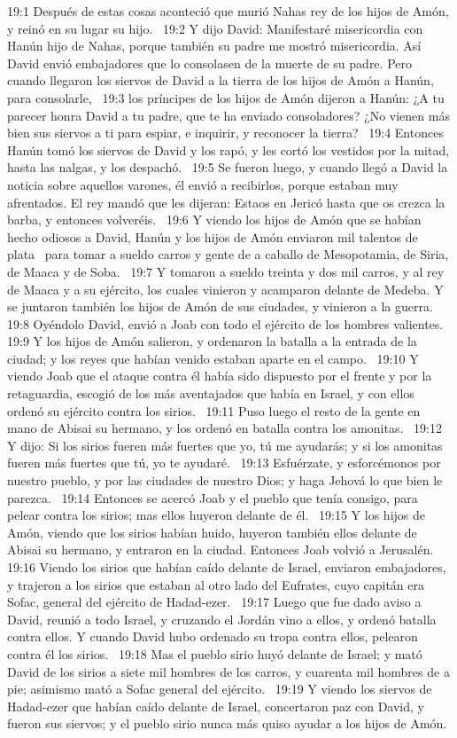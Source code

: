 19:1 Después de estas cosas aconteció que murió Nahas rey de los hijos de Amón, y reinó en su lugar su hijo.  
19:2 Y dijo David: Manifestaré misericordia con Hanún hijo de Nahas, porque también su padre me mostró misericordia. Así David envió embajadores que lo consolasen de la muerte de su padre. Pero cuando llegaron los siervos de David a la tierra de los hijos de Amón a Hanún, para consolarle,  
19:3 los príncipes de los hijos de Amón dijeron a Hanún: ¿A tu parecer honra David a tu padre, que te ha enviado consoladores? ¿No vienen más bien sus siervos a ti para espiar, e inquirir, y reconocer la tierra?  
19:4 Entonces Hanún tomó los siervos de David y los rapó, y les cortó los vestidos por la mitad, hasta las nalgas, y los despachó.  
19:5 Se fueron luego, y cuando llegó a David la noticia sobre aquellos varones, él envió a recibirlos, porque estaban muy afrentados. El rey mandó que les dijeran: Estaos en Jericó hasta que os crezca la barba, y entonces volveréis.  
19:6 Y viendo los hijos de Amón que se habían hecho odiosos a David, Hanún y los hijos de Amón enviaron mil talentos de plata  para tomar a sueldo carros y gente de a caballo de Mesopotamia, de Siria, de Maaca y de Soba.  
19:7 Y tomaron a sueldo treinta y dos mil carros, y al rey de Maaca y a su ejército, los cuales vinieron y acamparon delante de Medeba. Y se juntaron también los hijos de Amón de sus ciudades, y vinieron a la guerra.  
19:8 Oyéndolo David, envió a Joab con todo el ejército de los hombres valientes.  
19:9 Y los hijos de Amón salieron, y ordenaron la batalla a la entrada de la ciudad; y los reyes que habían venido estaban aparte en el campo.  
19:10 Y viendo Joab que el ataque contra él había sido dispuesto por el frente y por la retaguardia, escogió de los más aventajados que había en Israel, y con ellos ordenó su ejército contra los sirios.  
19:11 Puso luego el resto de la gente en mano de Abisai su hermano, y los ordenó en batalla contra los amonitas.  
19:12 Y dijo: Si los sirios fueren más fuertes que yo, tú me ayudarás; y si los amonitas fueren más fuertes que tú, yo te ayudaré.  
19:13 Esfuérzate, y esforcémonos por nuestro pueblo, y por las ciudades de nuestro Dios; y haga Jehová lo que bien le parezca.  
19:14 Entonces se acercó Joab y el pueblo que tenía consigo, para pelear contra los sirios; mas ellos huyeron delante de él.  
19:15 Y los hijos de Amón, viendo que los sirios habían huido, huyeron también ellos delante de Abisai su hermano, y entraron en la ciudad. Entonces Joab volvió a Jerusalén.  
19:16 Viendo los sirios que habían caído delante de Israel, enviaron embajadores, y trajeron a los sirios que estaban al otro lado del Eufrates, cuyo capitán era Sofac, general del ejército de Hadad-ezer.  
19:17 Luego que fue dado aviso a David, reunió a todo Israel, y cruzando el Jordán vino a ellos, y ordenó batalla contra ellos. Y cuando David hubo ordenado su tropa contra ellos, pelearon contra él los sirios.  
19:18 Mas el pueblo sirio huyó delante de Israel; y mató David de los sirios a siete mil hombres de los carros, y cuarenta mil hombres de a pie; asimismo mató a Sofac general del ejército.  
19:19 Y viendo los siervos de Hadad-ezer que habían caído delante de Israel, concertaron paz con David, y fueron sus siervos; y el pueblo sirio nunca más quiso ayudar a los hijos de Amón.  

